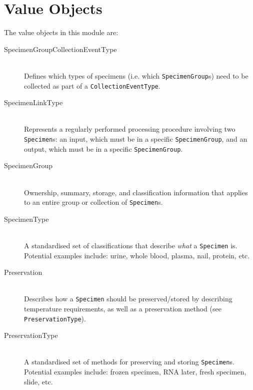 \section{Value Objects}

The value objects in this module are:

\begin{description}

  \item[SpecimenGroupCollectionEventType] \hfill \\ Defines which types of
    specimens (i.e. which \texttt{SpecimenGroup}s) need to be collected as
    part of a \texttt{CollectionEventType}.

  \item[SpecimenLinkType] \hfill \\ Represents a regularly performed processing
    procedure involving two \texttt{Specimen}s: an input, which must be in a
    specific \texttt{SpecimenGroup}, and an output, which must be in a specific
    \texttt{SpecimenGroup}.

  \item[SpecimenGroup] \hfill \\ Ownership, summary, storage, and
    classification information that applies to an entire group or collection of
    \texttt{Specimen}s.

  \item[SpecimenType] \hfill \\ A standardised set of classifications that
    describe \emph{what} a \texttt{Specimen} is. Potential examples include:
    urine, whole blood, plasma, nail, protein, etc.

  \item[Preservation] \hfill \\ Describes how a \texttt{Specimen} should be
    preserved/stored by describing temperature requirements, as well as a
    preservation method (see \texttt{PreservationType}).

  \item[PreservationType] \hfill \\ A standardised set of methods for
    preserving and storing \texttt{Specimen}s.  Potential examples include:
    frozen specimen, RNA later, fresh specimen, slide, etc.

  \item[] \hfill \\

  \item[] \hfill \\

  \item[] \hfill \\

  \item[] \hfill \\


\end{description}
